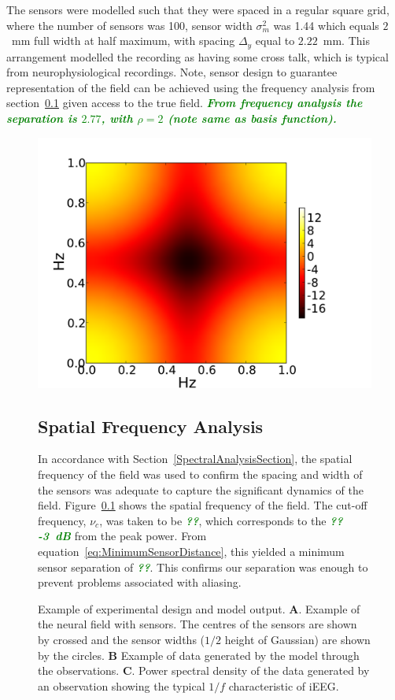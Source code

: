 \documentclass[12pt]{iopart}		%
\newcommand{\omg}[1]{\textsf{\emph{\textbf{\textcolor{green}{#1}}}}}
\begin{document}
The sensors were modelled such that they were spaced in a regular square grid, where the number of sensors was 100, sensor width $\sigma^2_m$ was 1.44 which equals $2$~mm full width at half maximum, with spacing $\Delta_y$ equal to $2.22$~mm. This arrangement modelled the recording as having some cross talk, which is typical from neurophysiological recordings. Note, sensor design to guarantee representation of the field can be achieved using the frequency analysis from section~\ref{} given access to the true field. \omg{From frequency analysis the separation is $2.77$, with $\rho = 2$ (note same as basis function).}
\begin{figure}
	\begin{center}
		\includegraphics[scale=0.2]{./Graph/kernel.pdf}
	\end{center}
	\caption{Example of experimental design and model output. \textbf{A}. Example of the neural field with sensors. The centres of the sensors are shown by crossed and the sensor widths ($1/2$ height of Gaussian) are shown by the circles. \textbf{B} Example of data generated by the model through the observations. \textbf{C}. Power spectral density of the data generated by an observation showing the typical $1/f$ characteristic of iEEG.}

\subsection{Spatial Frequency Analysis}
In accordance with Section~\ref{SpectralAnalysisSection}, the spatial frequency of the field was used to confirm the spacing and width of the sensors was adequate to capture the significant dynamics of the field. Figure~\ref{} shows the spatial frequency of the field. The cut-off frequency, $\nu_c$, was taken to be \omg{??}, which corresponds to the \omg{??-3~dB} from the peak power. From equation~\ref{eq:MinimumSensorDistance}, this yielded a minimum sensor separation of \omg{??}. This confirms our separation was enough to prevent problems associated with aliasing.


\end{figure}
\end{document}
